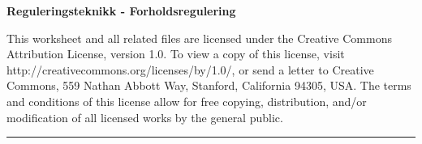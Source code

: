 
\centerline{\bf Reguleringsteknikk - Forholdsregulering} \bigskip 
 
This worksheet and all related files are licensed under the Creative Commons Attribution License, version 1.0.  To view a copy of this license, visit http://creativecommons.org/licenses/by/1.0/, or send a letter to Creative Commons, 559 Nathan Abbott Way, Stanford, California 94305, USA.  The terms and conditions of this license allow for free copying, distribution, and/or modification of all licensed works by the general public.

\bigskip 

\hrule

\vfil \eject


